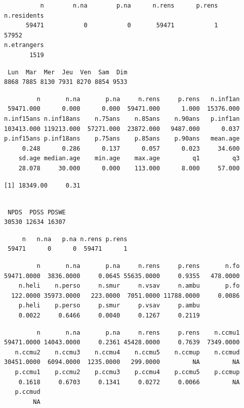 \documentclass[]{article}
\begin{document}
\begin{verbatim}
          n        n.na        p.na      n.rens      p.rens n.residents 
      59471           0           0       59471           1       57952 
n.etrangers 
       1519 
\end{verbatim}

\begin{verbatim}
 Lun  Mar  Mer  Jeu  Ven  Sam  Dim 
8868 7885 8130 7931 8270 8854 9533 
\end{verbatim}

\begin{verbatim}
         n       n.na       p.na     n.rens     p.rens   n.inf1an 
 59471.000      0.000      0.000  59471.000      1.000  15376.000 
n.inf15ans n.inf18ans    n.75ans    n.85ans    n.90ans   p.inf1an 
103413.000 119213.000  57271.000  23872.000   9487.000      0.037 
p.inf15ans p.inf18ans    p.75ans    p.85ans    p.90ans   mean.age 
     0.248      0.286      0.137      0.057      0.023     34.600 
    sd.age median.age    min.age    max.age         q1         q3 
    28.078     30.000      0.000    113.000      8.000     57.000 
\end{verbatim}

\begin{verbatim}
[1] 18349.00     0.31
\end{verbatim}

\begin{verbatim}

 NPDS  PDSS PDSWE 
30530 12634 16307 
\end{verbatim}

\begin{verbatim}
     n   n.na   p.na n.rens p.rens 
 59471      0      0  59471      1 
\end{verbatim}

\begin{verbatim}
         n       n.na       p.na     n.rens     p.rens       n.fo 
59471.0000  3836.0000     0.0645 55635.0000     0.9355   478.0000 
    n.heli    n.perso     n.smur     n.vsav     n.ambu       p.fo 
  122.0000 35973.0000   223.0000  7051.0000 11788.0000     0.0086 
    p.heli    p.perso     p.smur     p.vsav     p.ambu 
    0.0022     0.6466     0.0040     0.1267     0.2119 
\end{verbatim}

\begin{verbatim}
         n       n.na       p.na     n.rens     p.rens    n.ccmu1 
59471.0000 14043.0000     0.2361 45428.0000     0.7639  7349.0000 
   n.ccmu2    n.ccmu3    n.ccmu4    n.ccmu5    n.ccmup    n.ccmud 
30451.0000  6094.0000  1235.0000   299.0000         NA         NA 
   p.ccmu1    p.ccmu2    p.ccmu3    p.ccmu4    p.ccmu5    p.ccmup 
    0.1618     0.6703     0.1341     0.0272     0.0066         NA 
   p.ccmud 
        NA 
\end{verbatim}
\end{document}
